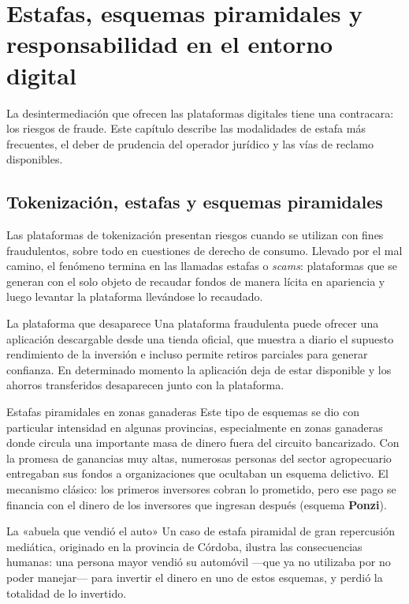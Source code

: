 \documentclass[12pt,oneside]{book}
\begin{document}
\chapter{Estafas, esquemas piramidales y responsabilidad en el entorno digital}
\label{cap:riesgos}

La desintermediación que ofrecen las plataformas digitales tiene una contracara: los riesgos de fraude. Este capítulo describe las modalidades de estafa más frecuentes, el deber de prudencia del operador jurídico y las vías de reclamo disponibles.

\section{Tokenización, estafas y esquemas piramidales}

Las plataformas de tokenización presentan riesgos cuando se utilizan con fines fraudulentos, sobre todo en cuestiones de derecho de consumo. Llevado por el mal camino, el fenómeno termina en las llamadas estafas o \emph{scams}: plataformas que se generan con el solo objeto de recaudar fondos de manera lícita en apariencia y luego levantar la plataforma llevándose lo recaudado.

\begin{example}{La plataforma que desaparece}
Una plataforma fraudulenta puede ofrecer una aplicación descargable desde una tienda oficial, que muestra a diario el supuesto rendimiento de la inversión e incluso permite retiros parciales para generar confianza. En determinado momento la aplicación deja de estar disponible y los ahorros transferidos desaparecen junto con la plataforma.
\end{example}

\begin{example}{Estafas piramidales en zonas ganaderas}
Este tipo de esquemas se dio con particular intensidad en algunas provincias, especialmente en zonas ganaderas donde circula una importante masa de dinero fuera del circuito bancarizado. Con la promesa de ganancias muy altas, numerosas personas del sector agropecuario entregaban sus fondos a organizaciones que ocultaban un esquema delictivo. El mecanismo clásico: los primeros inversores cobran lo prometido, pero ese pago se financia con el dinero de los inversores que ingresan después (esquema \textbf{Ponzi}).
\end{example}

\begin{example}{La «abuela que vendió el auto»}
Un caso de estafa piramidal de gran repercusión mediática, originado en la provincia de Córdoba, ilustra las consecuencias humanas: una persona mayor vendió su automóvil ---que ya no utilizaba por no poder manejar--- para invertir el dinero en uno de estos esquemas, y perdió la totalidad de lo invertido.
\end{example}
\end{document}
